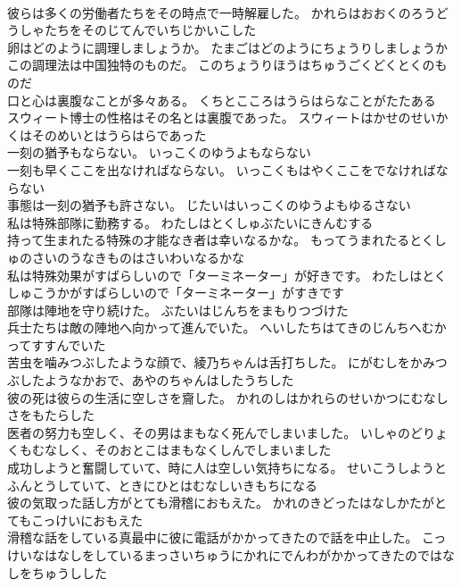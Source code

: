 \documentclass[8pt]{extreport}
\begin{document}
\begin{CJK}{UTF8}{min}
\\	彼らは多くの労働者たちをその時点で一時解雇した。	かれらはおおくのろうどうしゃたちをそのじてんでいちじかいこした 
\\	卵はどのように調理しましょうか。	たまごはどのようにちょうりしましょうか 
\\	この調理法は中国独特のものだ。	このちょうりほうはちゅうごくどくとくのものだ 
\\	口と心は裏腹なことが多々ある。	くちとこころはうらはらなことがたたある 
\\	スウィート博士の性格はその名とは裏腹であった。	スウィートはかせのせいかくはそのめいとはうらはらであった 
\\	一刻の猶予もならない。	いっこくのゆうよもならない 
\\	一刻も早くここを出なければならない。	いっこくもはやくここをでなければならない 
\\	事態は一刻の猶予も許さない。	じたいはいっこくのゆうよもゆるさない 
\\	私は特殊部隊に勤務する。	わたしはとくしゅぶたいにきんむする 
\\	持って生まれたる特殊の才能なき者は幸いなるかな。	もってうまれたるとくしゅのさいのうなきものはさいわいなるかな 
\\	私は特殊効果がすばらしいので「ターミネーター」が好きです。	わたしはとくしゅこうかがすばらしいので「ターミネーター」がすきです 
\\	部隊は陣地を守り続けた。	ぶたいはじんちをまもりつづけた 
\\	兵士たちは敵の陣地へ向かって進んでいた。	へいしたちはてきのじんちへむかってすすんでいた 
\\	苦虫を噛みつぶしたような顔で、綾乃ちゃんは舌打ちした。	にがむしをかみつぶしたようなかおで、あやのちゃんはしたうちした 
\\	彼の死は彼らの生活に空しさを齎した。	かれのしはかれらのせいかつにむなしさをもたらした 
\\	医者の努力も空しく、その男はまもなく死んでしまいました。	いしゃのどりょくもむなしく、そのおとこはまもなくしんでしまいました 
\\	成功しようと奮闘していて、時に人は空しい気持ちになる。	せいこうしようとふんとうしていて、ときにひとはむなしいきもちになる 
\\	彼の気取った話し方がとても滑稽におもえた。	かれのきどったはなしかたがとてもこっけいにおもえた 
\\	滑稽な話をしている真最中に彼に電話がかかってきたので話を中止した。	こっけいなはなしをしているまっさいちゅうにかれにでんわがかかってきたのではなしをちゅうしした 

\end{CJK}
\end{document}
